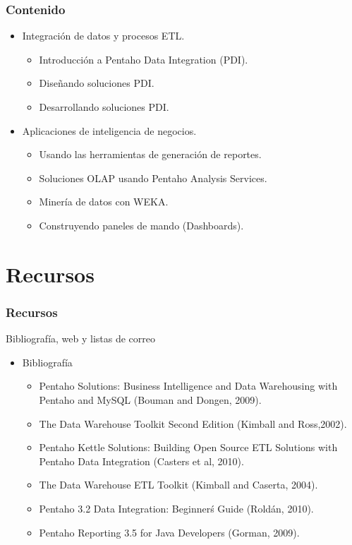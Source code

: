 \documentclass{beamer}
\begin{document}
\begin{frame}\frametitle{Contenido}
  \begin{itemize}
    \item Integración de datos y procesos ETL.
      \begin{itemize}
	\item Introducción a Pentaho Data Integration (PDI).
	\item Diseñando soluciones PDI.
	\item Desarrollando soluciones PDI.
      \end{itemize}
    \item Aplicaciones de inteligencia de negocios.
      \begin{itemize}
	\item Usando las herramientas de generación de reportes.
	\item Soluciones OLAP usando Pentaho Analysis Services.
	\item Minería de datos con WEKA.
	\item Construyendo paneles de mando (Dashboards).
      \end{itemize}
  \end{itemize}
\end{frame}

\section{Recursos}
\begin{frame}\frametitle{Recursos}
  \begin{block}{Bibliografía, web y listas de correo}
    \begin{itemize}
      \item Bibliografía
	\begin{itemize}
	  \item Pentaho Solutions: Business Intelligence and Data Warehousing with Pentaho and MySQL (Bouman and Dongen, 2009).
	  \item The Data Warehouse Toolkit Second Edition (Kimball and Ross,2002).
	  \item Pentaho Kettle Solutions: Building Open Source ETL Solutions with Pentaho Data Integration (Casters et al, 2010).
	  \item The Data Warehouse ETL Toolkit (Kimball and Caserta, 2004).
	  \item Pentaho 3.2 Data Integration: Beginner\'s Guide (Roldán, 2010).
	  \item Pentaho Reporting 3.5 for Java Developers (Gorman, 2009).
	\end{itemize}
    \end{itemize}
  \end{block}
\end{frame}
\end{document}

